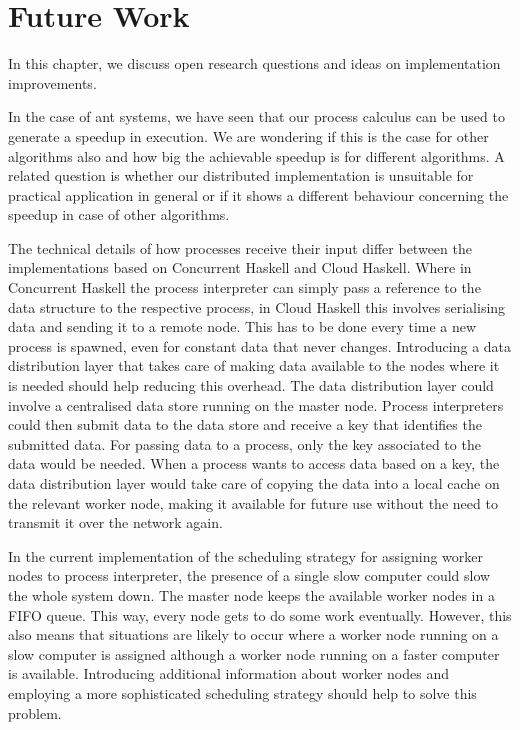 \chapter{Future Work}
In this chapter, we discuss open research questions and ideas on implementation improvements.

In the case of ant systems, we have seen that our process calculus can be used to generate a speedup in execution. We are wondering if this is the case for other algorithms also and how big the achievable speedup is for different algorithms. A related question is whether our distributed implementation is unsuitable for practical application in general or if it shows a different behaviour concerning the speedup in case of other algorithms.

The technical details of how processes receive their input differ between the implementations based on \textsf{Concurrent Haskell} and \textsf{Cloud Haskell}. Where in \textsf{Concurrent Haskell} the process interpreter can simply pass a reference to the data structure to the respective process, in \textsf{Cloud Haskell} this involves serialising data and sending it to a remote node. This has to be done every time a new process is spawned, even for constant data that never changes. Introducing a data distribution layer that takes care of making data available to the nodes where it is needed should help reducing this overhead. The data distribution layer could involve a centralised data store running on the master node. Process interpreters could then submit data to the data store and receive a key that identifies the submitted data. For passing data to a process, only the key associated to the data would be needed. When a process wants to access data based on a key, the data distribution layer would take care of copying the data into a local cache on the relevant worker node, making it available for future use without the need to transmit it over the network again.

In the current implementation of the scheduling strategy for assigning worker nodes to process interpreter, the presence of a single slow computer could slow the whole system down. The master node keeps the available worker nodes in a FIFO queue. This way, every node gets to do some work eventually. However, this also means that situations are likely to occur where a worker node running on a slow computer is assigned although a worker node running on a faster computer is available. Introducing additional information about worker nodes and employing a more sophisticated scheduling strategy should help to solve this problem.